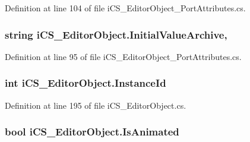 Definition at line 104 of file i\+C\+S\+\_\+\+Editor\+Object\+\_\+\+Port\+Attributes.\+cs.

\hypertarget{classi_c_s___editor_object_afdd07667f018ee4cff4ebf4b9bf63188}{
\subsubsection[{Initial\+Value\+Archive}]{\setlength{\rightskip}{0pt plus 5cm}string i\+C\+S\+\_\+\+Editor\+Object.\+Initial\+Value\+Archive\hspace{0.3cm}{\ttfamily [get]}, {\ttfamily [set]}}}\label{classi_c_s___editor_object_afdd07667f018ee4cff4ebf4b9bf63188}


Definition at line 95 of file i\+C\+S\+\_\+\+Editor\+Object\+\_\+\+Port\+Attributes.\+cs.

\hypertarget{classi_c_s___editor_object_a496d95ff09e943db2635ef2f22a4b952}{
\subsubsection[{Instance\+Id}]{\setlength{\rightskip}{0pt plus 5cm}int i\+C\+S\+\_\+\+Editor\+Object.\+Instance\+Id\hspace{0.3cm}{\ttfamily [get]}}}\label{classi_c_s___editor_object_a496d95ff09e943db2635ef2f22a4b952}


Definition at line 195 of file i\+C\+S\+\_\+\+Editor\+Object.\+cs.

\hypertarget{classi_c_s___editor_object_a4b0fb9e2867315c4f70a72b7661901a5}{
\subsubsection[{Is\+Animated}]{\setlength{\rightskip}{0pt plus 5cm}bool i\+C\+S\+\_\+\+Editor\+Object.\+Is\+Animated\hspace{0.3cm}{\ttfamily [get]}}}\label{classi_c_s___editor_object_a4b0fb9e2867315c4f70a72b7661901a5}


